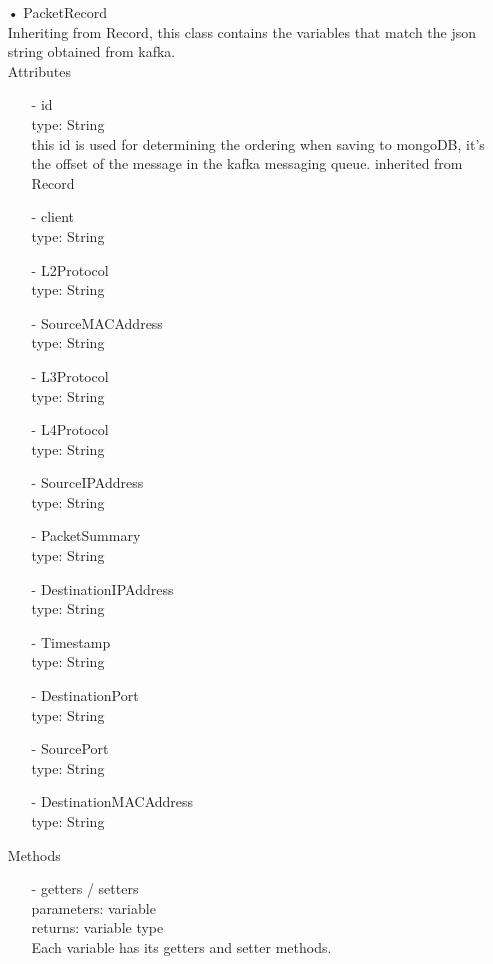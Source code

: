 \documentclass[oneside, english, final]{design}
\begin{document}
\begin{itemize}
	\item[•]PacketRecord
	      \\Inheriting from Record, this class contains the variables that match the json string obtained from kafka.
	      \\Attributes
	      \begin{itemize}
		      \item[-] id
		            \\type: String
		            \\this id is used for determining the ordering when saving to mongoDB, it's the offset of the message in the kafka messaging queue. inherited from Record
		      \item[-] client
		            \\type: String
		      \item[-] L2Protocol
		            \\type: String
		      \item[-] SourceMACAddress
		            \\type: String
		      \item[-] L3Protocol
		            \\type: String
		      \item[-] L4Protocol
		            \\type: String
		      \item[-] SourceIPAddress
		            \\type: String
		      \item[-] PacketSummary
		            \\type: String
		      \item[-] DestinationIPAddress
		            \\type: String
		      \item[-] Timestamp
		            \\type: String
		      \item[-] DestinationPort
		            \\type: String
		      \item[-] SourcePort
		            \\type: String
		      \item[-] DestinationMACAddress
		            \\type: String

	      \end{itemize}

	      Methods
	      \begin{itemize}
		      \item[-]getters / setters
		            \\parameters: variable
		            \\returns: variable type
		            \\Each variable has its getters and setter methods.
	      \end{itemize}


\end{itemize}
\end{document}
